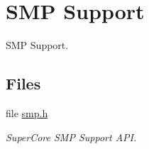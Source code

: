 \hypertarget{group__RTEMSScoreSMP}{}\section{S\+MP Support}
\label{group__RTEMSScoreSMP}


S\+MP Support.  


\subsection*{Files}
\begin{DoxyCompactItemize}
\item 
file \mbox{\hyperlink{smp_8h}{smp.\+h}}
\begin{DoxyCompactList}\small\item\em Super\+Core S\+MP Support A\+PI. \end{DoxyCompactList}\end{DoxyCompactItemize}
